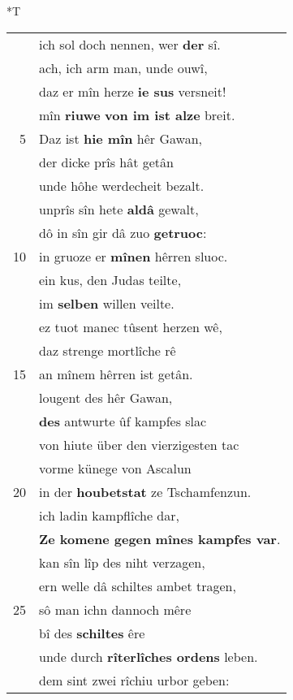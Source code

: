 \documentclass[8pt,a4paper,notitlepage]{article}
\begin{document}
\begin{table}[ht]
\begin{minipage}[t]{0.5\linewidth}
\end{minipage}
\hspace{0.5cm}
\begin{minipage}[t]{0.5\linewidth}
\small
\begin{center}*T
\end{center}
\begin{tabular}{rl}
 & ich sol doch nennen, wer \textbf{der} sî.\\ 
 & ach, ich arm man, unde ouwî,\\ 
 & daz er mîn herze \textbf{ie sus} versneit!\\ 
 & mîn \textbf{riuwe} \textbf{von im ist alze} breit.\\ 
5 & Daz ist \textbf{hie mîn} hêr Gawan,\\ 
 & der dicke prîs hât getân\\ 
 & unde hôhe werdecheit bezalt.\\ 
 & unprîs sîn hete \textbf{aldâ} gewalt,\\ 
 & dô in sîn gir dâ zuo \textbf{getruoc}:\\ 
10 & in gruoze er \textbf{mînen} hêrren sluoc.\\ 
 & ein kus, den Judas teilte,\\ 
 & im \textbf{selben} willen veilte.\\ 
 & ez tuot manec tûsent herzen wê,\\ 
 & daz strenge mortlîche rê\\ 
15 & an mînem hêrren ist getân.\\ 
 & lougent des hêr Gawan,\\ 
 & \textbf{des} antwurte ûf kampfes slac\\ 
 & von hiute über den vierzigesten tac\\ 
 & vorme künege von Ascalun\\ 
20 & in der \textbf{houbetstat} ze Tschamfenzun.\\ 
 & ich ladin kampflîche dar,\\ 
 & \textbf{Ze komene gegen} \textbf{mînes kampfes var}.\\ 
 & kan sîn lîp des niht verzagen,\\ 
 & ern welle dâ schiltes ambet tragen,\\ 
25 & sô man ichn dannoch mêre\\ 
 & bî des \textbf{schiltes} êre\\ 
 & unde durch \textbf{rîterlîches ordens} leben.\\ 
 & dem sint zwei rîchiu urbor geben:\\ 

\end{tabular}
\end{minipage}
\end{table}
\end{document}
